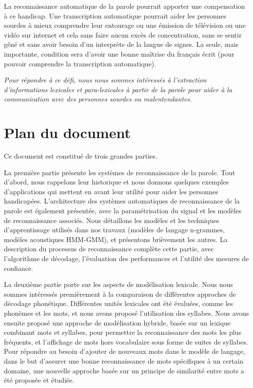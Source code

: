 \documentclass{style/these}
\begin{document}
La reconnaissance automatique de la parole pourrait apporter une compensation à ce handicap. Une transcription automatique pourrait aider les personnes sourdes à mieux comprendre leur entourage ou une émission de télévision ou une vidéo sur internet et cela sans faire aucun excès de concentration, sans se sentir gêné et sans avoir besoin d'un interprète de la langue de signes. 
La seule, mais importante, condition sera d'avoir une bonne maîtrise du français écrit (pour pouvoir comprendre la transcription automatique). 

\textit{Pour répondre à ce défi, nous nous sommes intéressés à l'extraction d'informations lexicales et para-lexicales à partir de la parole pour aider à la communication avec des personnes
sourdes ou malentendantes. }

\section*{Plan du document}
\renewcommand{\rightmark}{Plan du document}

Ce document est constitué de trois grandes parties.

La première partie présente les systèmes de reconnaissance de la parole. 
Tout d'abord, nous rappelons leur historique et nous donnons quelques exemples d'applications qui mettent en avant leur utilité pour aider les personnes handicapées. 
L'architecture des systèmes automatiques de reconnaissance de la parole est également présentée, avec la paramétrisation du signal et les modèles de reconnaissance associés. 
Nous détaillons les modèles et les techniques d'apprentissage utilisés dans nos travaux (modèles de langage n-grammes, modèles acoustiques \acrshort{HMM}-\acrshort{GMM}), et présentons brièvement les autres. 
La description du processus de reconnaissance complète cette partie, avec l'algorithme de décodage, l'évaluation des performances et l'utilité des mesures de confiance.  

La deuxième partie porte sur les aspects de modélisation lexicale. 
Nous nous sommes intéressés premièrement à la comparaison de différentes approches de décodage phonétique. 
Différentes unités lexicales ont été évaluées, comme les phonèmes et les mots, et nous avons proposé l'utilisation des syllabes. 
Nous avons ensuite proposé une approche de modélisation hybride, basée sur un lexique combinant mots et syllabes, pour permettre la reconnaissance des mots les plus fréquents, et l'affichage de mots hors vocabulaire sous forme de suites de syllabes. 
Pour répondre au besoin d'ajouter de nouveaux mots dans le modèle de langage, dans le but d'assurer une bonne reconnaissance de mots spécifiques à un certain domaine, une nouvelle approche basée sur un principe de similarité entre mots a été proposée et étudiée. 
\end{document}
